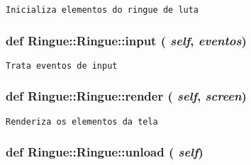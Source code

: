 \begin{footnotesize}\begin{verbatim}Inicializa elementos do ringue de luta \end{verbatim}
\end{footnotesize}
 \hypertarget{class_ringue_1_1_ringue_dc4bdb8ddd4d0138ff7911365893e102}{
\subsubsection[{input}]{\setlength{\rightskip}{0pt plus 5cm}def Ringue::Ringue::input ( {\em self}, \/   {\em eventos})}}
\label{class_ringue_1_1_ringue_dc4bdb8ddd4d0138ff7911365893e102}




\begin{footnotesize}\begin{verbatim}Trata eventos de input \end{verbatim}
\end{footnotesize}
 \hypertarget{class_ringue_1_1_ringue_14225440624ea7fa7fe6414609521211}{
\subsubsection[{render}]{\setlength{\rightskip}{0pt plus 5cm}def Ringue::Ringue::render ( {\em self}, \/   {\em screen})}}
\label{class_ringue_1_1_ringue_14225440624ea7fa7fe6414609521211}




\begin{footnotesize}\begin{verbatim}Renderiza os elementos da tela \end{verbatim}
\end{footnotesize}
 \hypertarget{class_ringue_1_1_ringue_43bae6bbbab438c41367fd2248dec6b6}{
\subsubsection[{unload}]{\setlength{\rightskip}{0pt plus 5cm}def Ringue::Ringue::unload ( {\em self})}}
\label{class_ringue_1_1_ringue_43bae6bbbab438c41367fd2248dec6b6}




